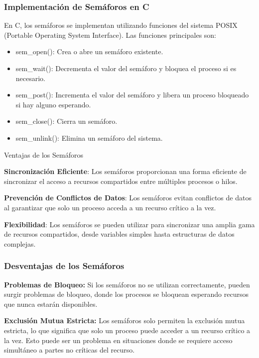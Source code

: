 \subsubsection{Implementación de Semáforos en C}\label{implementaciuxf3n-de-semuxe1foros-en-c}

En C, los semáforos se implementan utilizando funciones del sistema POSIX (Portable Operating System Interface). Las funciones principales son:

\begin{itemize} \item   sem\_open(): Crea o abre un semáforo existente. \item   sem\_wait(): Decrementa el valor del semáforo y bloquea el proceso si   es necesario. \item   sem\_post(): Incrementa el valor del semáforo y libera un proceso   bloqueado si hay alguno esperando. \item   sem\_close(): Cierra un semáforo. \item   sem\_unlink(): Elimina un semáforo del sistema. \end{itemize}

Ventajas de los Semáforos

\textbf{Sincronización Eficiente}: Los semáforos proporcionan una forma eficiente de sincronizar el acceso a recursos compartidos entre múltiples procesos o hilos.

\textbf{Prevención de Conflictos de Datos}: Los semáforos evitan conflictos de datos al garantizar que solo un proceso acceda a un recurso crítico a la vez.

\textbf{Flexibilidad}: Los semáforos se pueden utilizar para sincronizar una amplia gama de recursos compartidos, desde variables simples hasta estructuras de datos complejas.

\subsubsection{Desventajas de los Semáforos}\label{desventajas-de-los-semuxe1foros}

\textbf{Problemas de Bloqueo:} Si los semáforos no se utilizan correctamente, pueden surgir problemas de bloqueo, donde los procesos se bloquean esperando recursos que nunca estarán disponibles.

\textbf{Exclusión Mutua Estricta:} Los semáforos solo permiten la exclusión mutua estricta, lo que significa que solo un proceso puede acceder a un recurso crítico a la vez. Esto puede ser un problema en situaciones donde se requiere acceso simultáneo a partes no críticas del recurso.

